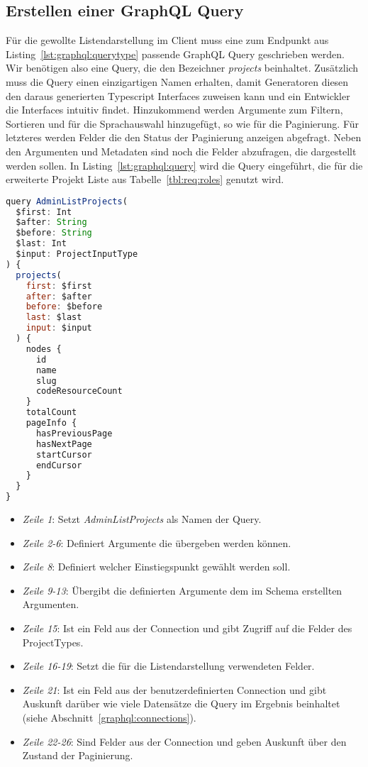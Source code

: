 \subsection{Erstellen einer GraphQL Query}
\label{impl:graphql:query}
Für die gewollte Listendarstellung im Client muss eine zum Endpunkt aus Listing~\ref{lst:graphql:querytype} passende GraphQL Query geschrieben werden. Wir benötigen also eine Query, die den Bezeichner \emph{projects} beinhaltet. Zusätzlich muss die Query einen einzigartigen Namen erhalten, damit Generatoren diesen den daraus generierten Typescript Interfaces zuweisen kann und ein Entwickler die Interfaces intuitiv findet. Hinzukommend werden Argumente zum Filtern, Sortieren und für die Sprachauswahl hinzugefügt, so wie für die Paginierung. Für letzteres werden Felder die den Status der Paginierung anzeigen abgefragt. Neben den Argumenten und Metadaten 
sind noch die Felder abzufragen, die dargestellt werden sollen.
In Listing~\ref{lst:graphql:query} wird die Query eingeführt, die für die erweiterte Projekt Liste aus Tabelle~\ref{tbl:req:roles} genutzt wird.

\begin{lstlisting}[language=JavaScript,float=h!,caption={GraphQL Query für eine paginierte Listendarstellung mit Möglichkeit des Filterns, der Sortierung und der Sprachauswahl}, label={lst:graphql:query}]
query AdminListProjects(
  $first: Int
  $after: String
  $before: String
  $last: Int
  $input: ProjectInputType
) {
  projects(
    first: $first
    after: $after
    before: $before
    last: $last
    input: $input
  ) {
    nodes {
      id
      name
      slug
      codeResourceCount
    }
	totalCount
	pageInfo {
	  hasPreviousPage
	  hasNextPage
	  startCursor
	  endCursor
	}
  }
}
\end{lstlisting}

\begin{itemize}
	\setlength\itemsep{-1em}
	\item \emph{Zeile 1}: Setzt \emph{AdminListProjects} als Namen der Query.
	\item \emph{Zeile 2-6}: Definiert Argumente die übergeben werden können.
	\item \emph{Zeile 8}: Definiert welcher Einstiegspunkt gewählt werden soll.
	\item \emph{Zeile 9-13}: Übergibt die definierten Argumente dem im Schema erstellten Argumenten.
	\item \emph{Zeile 15}: Ist ein Feld aus der Connection und gibt Zugriff auf die Felder des ProjectTypes.
	\item \emph{Zeile 16-19}: Setzt die für die Listendarstellung verwendeten Felder.
	\item \emph{Zeile 21}: Ist ein Feld aus der benutzerdefinierten Connection und gibt Auskunft darüber wie viele Datensätze die Query im Ergebnis beinhaltet (siehe Abschnitt~\ref{graphql:connections}).
	\item \emph{Zeile 22-26}: Sind Felder aus der Connection und geben Auskunft über den Zustand der Paginierung.
\end{itemize}

